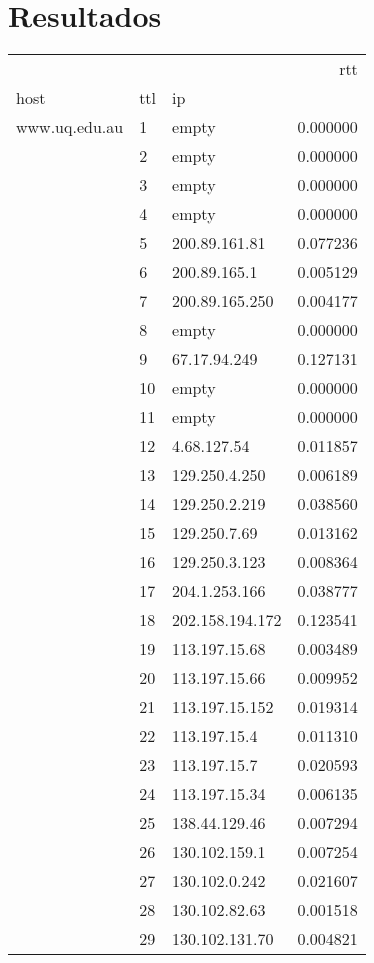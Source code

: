 \newpage
\section{Resultados}
\begin{center}
\begin{tabular}{lllr}
\toprule
              &    &                &       rtt \\
host & ttl & ip &           \\
\midrule
www.uq.edu.au & 1  & empty &  0.000000 \\
              & 2  & empty &  0.000000 \\
              & 3  & empty &  0.000000 \\
              & 4  & empty &  0.000000 \\
              & 5  & 200.89.161.81 &  0.077236 \\
              & 6  & 200.89.165.1 &  0.005129 \\
              & 7  & 200.89.165.250 &  0.004177 \\
              & 8  & empty &  0.000000 \\
              & 9  & 67.17.94.249 &  0.127131 \\
              & 10 & empty &  0.000000 \\
              & 11 & empty &  0.000000 \\
              & 12 & 4.68.127.54 &  0.011857 \\
              & 13 & 129.250.4.250 &  0.006189 \\
              & 14 & 129.250.2.219 &  0.038560 \\
              & 15 & 129.250.7.69 &  0.013162 \\
              & 16 & 129.250.3.123 &  0.008364 \\
              & 17 & 204.1.253.166 &  0.038777 \\
              & 18 & 202.158.194.172 &  0.123541 \\
              & 19 & 113.197.15.68 &  0.003489 \\
              & 20 & 113.197.15.66 &  0.009952 \\
              & 21 & 113.197.15.152 &  0.019314 \\
              & 22 & 113.197.15.4 &  0.011310 \\
              & 23 & 113.197.15.7 &  0.020593 \\
              & 24 & 113.197.15.34 &  0.006135 \\
              & 25 & 138.44.129.46 &  0.007294 \\
              & 26 & 130.102.159.1 &  0.007254 \\
              & 27 & 130.102.0.242 &  0.021607 \\
              & 28 & 130.102.82.63 &  0.001518 \\
              & 29 & 130.102.131.70 &  0.004821 \\
\bottomrule
\end{tabular}
\end{center}

